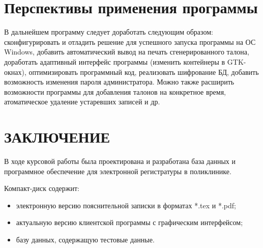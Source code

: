 \clearpage
\section{Перспективы применения программы}
\setcounter{figure}{0}
В дальнейшем программу следует доработать следующим образом:
сконфигурировать и отладить решение для успешного запуска программы на ОС Windows, добавить автоматический вывод на печать сгенерированного талона, доработать адаптивный интерфейс программы (изменить контейнеры в GTK-окнах), оптимизировать программный код, реализовать шифрование БД, добавить возможность изменения пароля администратора. Можно также расширить возможности программы для добавления талонов на конкретное время, атоматическое удаление устаревших записей и др.

\clearpage
\section*{ЗАКЛЮЧЕНИЕ}
В ходе курсовой работы была проектирована и разработана база данных и программное обеспечение для электронной регистратуры в поликлинике.

\clearpage
\renewcommand{\refname}{Список использованных источников}


Компакт-диск содержит: 
\begin{itemize}
\item электронную версию пояснительной записки в форматах *.tex и *.pdf;
\item актуальную версию клиентской программы с графическим интерфейсом;
\item базу данных, содержащую тестовые данные.
\end{itemize}


